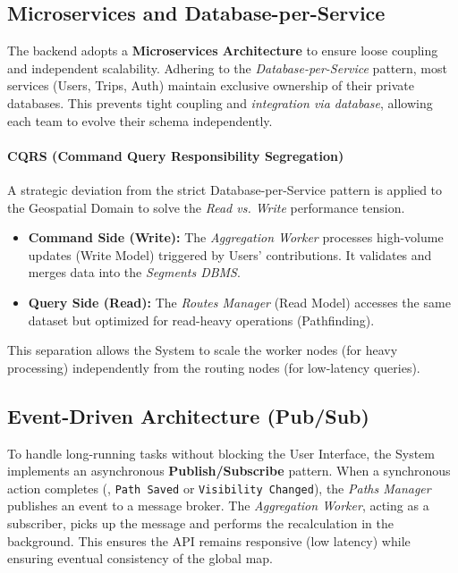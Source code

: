 \subsection*{Microservices and Database-per-Service}
The backend adopts a \textbf{Microservices Architecture} to ensure loose coupling and independent scalability. Adhering to the \emph{Database-per-Service} pattern, most services (Users, Trips, Auth) maintain exclusive ownership of their private databases. This prevents tight coupling and \emph{integration via database}, allowing each team to evolve their schema independently.

\paragraph*{CQRS (Command Query Responsibility Segregation)}
A strategic deviation from the strict Database-per-Service pattern is applied to the Geospatial Domain to solve the \emph{Read vs. Write} performance tension.
\begin{itemize}
    \item \textbf{Command Side (Write):} The \emph{Aggregation Worker} processes high-volume updates (Write Model) triggered by Users' contributions. It validates and merges data into the \emph{Segments DBMS}.
    \item \textbf{Query Side (Read):} The \emph{Routes Manager} (Read Model) accesses the same dataset but optimized for read-heavy operations (Pathfinding).
\end{itemize}
This separation allows the System to scale the worker nodes (for heavy processing) independently from the routing nodes (for low-latency queries).

\subsection*{Event-Driven Architecture (Pub/Sub)}
To handle long-running tasks without blocking the User Interface, the System implements an asynchronous \textbf{Publish/Subscribe} pattern.
When a synchronous action completes (\eg, \texttt{Path Saved} or \texttt{Visibility Changed}), the \emph{Paths Manager} publishes an event to a message broker. The \emph{Aggregation Worker}, acting as a subscriber, picks up the message and performs the recalculation in the background. This ensures the API remains responsive (low latency) while ensuring eventual consistency of the global map.

